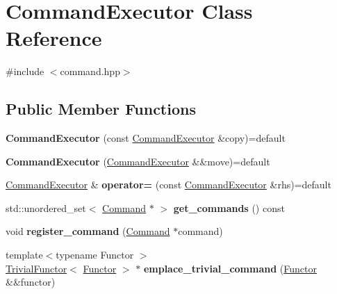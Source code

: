 \hypertarget{class_command_executor}{}\section{Command\+Executor Class Reference}
\label{class_command_executor}


{\ttfamily \#include $<$command.\+hpp$>$}

\subsection*{Public Member Functions}
\begin{DoxyCompactItemize}
\item 
\mbox{\label{class_command_executor_a79b6bc00111839e0eb3ca4f25078f4df}} 
{\bfseries Command\+Executor} (const \mbox{\hyperlink{class_command_executor}{Command\+Executor}} \&copy)=default
\item 
\mbox{\label{class_command_executor_a3441b23c3b3061f0906d5fa837c15c18}} 
{\bfseries Command\+Executor} (\mbox{\hyperlink{class_command_executor}{Command\+Executor}} \&\&move)=default
\item 
\mbox{\label{class_command_executor_a3cb5c70e729192b34b96b5fcbf65acf0}} 
\mbox{\hyperlink{class_command_executor}{Command\+Executor}} \& {\bfseries operator=} (const \mbox{\hyperlink{class_command_executor}{Command\+Executor}} \&rhs)=default
\item 
\mbox{\label{class_command_executor_a60a3ab2b3f7fde5c64bd213461061126}} 
std\+::unordered\+\_\+set$<$ \mbox{\hyperlink{class_command}{Command}} $\ast$ $>$ {\bfseries get\+\_\+commands} () const
\item 
\mbox{\label{class_command_executor_a37052aaf61623b511be1f75cbecab8b7}} 
void {\bfseries register\+\_\+command} (\mbox{\hyperlink{class_command}{Command}} $\ast$command)
\item 
\mbox{\label{class_command_executor_a988168a9e22cc38d309dd4c7c79921c1}} 
{\footnotesize template$<$typename Functor $>$ }\\\mbox{\hyperlink{class_trivial_functor}{Trivial\+Functor}}$<$ \mbox{\hyperlink{class_functor}{Functor}} $>$ $\ast$ {\bfseries emplace\+\_\+trivial\+\_\+command} (\mbox{\hyperlink{class_functor}{Functor}} \&\&functor)

\end{DoxyCompactItemize}
